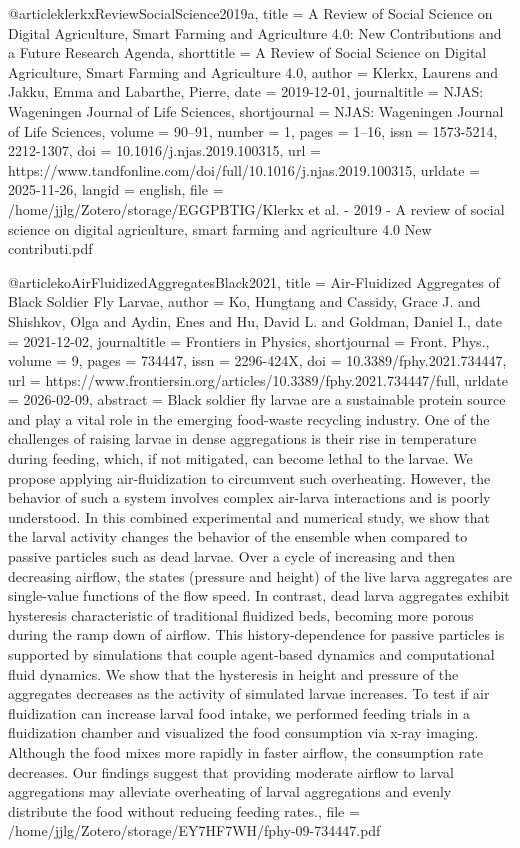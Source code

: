 {{{{@article{klerkxReviewSocialScience2019a,
  title = {A Review of Social Science on Digital Agriculture, Smart Farming and Agriculture 4.0: {{New}} Contributions and a Future Research Agenda},
  shorttitle = {A Review of Social Science on Digital Agriculture, Smart Farming and Agriculture 4.0},
  author = {Klerkx, Laurens and Jakku, Emma and Labarthe, Pierre},
  date = {2019-12-01},
  journaltitle = {NJAS: Wageningen Journal of Life Sciences},
  shortjournal = {NJAS: Wageningen Journal of Life Sciences},
  volume = {90--91},
  number = {1},
  pages = {1--16},
  issn = {1573-5214, 2212-1307},
  doi = {10.1016/j.njas.2019.100315},
  url = {https://www.tandfonline.com/doi/full/10.1016/j.njas.2019.100315},
  urldate = {2025-11-26},
  langid = {english},
  file = {/home/jjlg/Zotero/storage/EGGPBTIG/Klerkx et al. - 2019 - A review of social science on digital agriculture, smart farming and agriculture 4.0 New contributi.pdf}
}

@article{koAirFluidizedAggregatesBlack2021,
  title = {Air-{{Fluidized Aggregates}} of {{Black Soldier}} Fly {{Larvae}}},
  author = {Ko, Hungtang and Cassidy, Grace J. and Shishkov, Olga and Aydin, Enes and Hu, David L. and Goldman, Daniel I.},
  date = {2021-12-02},
  journaltitle = {Frontiers in Physics},
  shortjournal = {Front. Phys.},
  volume = {9},
  pages = {734447},
  issn = {2296-424X},
  doi = {10.3389/fphy.2021.734447},
  url = {https://www.frontiersin.org/articles/10.3389/fphy.2021.734447/full},
  urldate = {2026-02-09},
  abstract = {Black soldier fly larvae are a sustainable protein source and play a vital role in the emerging food-waste recycling industry. One of the challenges of raising larvae in dense aggregations is their rise in temperature during feeding, which, if not mitigated, can become lethal to the larvae. We propose applying air-fluidization to circumvent such overheating. However, the behavior of such a system involves complex air-larva interactions and is poorly understood. In this combined experimental and numerical study, we show that the larval activity changes the behavior of the ensemble when compared to passive particles such as dead larvae. Over a cycle of increasing and then decreasing airflow, the states (pressure and height) of the live larva aggregates are single-value functions of the flow speed. In contrast, dead larva aggregates exhibit hysteresis characteristic of traditional fluidized beds, becoming more porous during the ramp down of airflow. This history-dependence for passive particles is supported by simulations that couple agent-based dynamics and computational fluid dynamics. We show that the hysteresis in height and pressure of the aggregates decreases as the activity of simulated larvae increases. To test if air fluidization can increase larval food intake, we performed feeding trials in a fluidization chamber and visualized the food consumption via x-ray imaging. Although the food mixes more rapidly in faster airflow, the consumption rate decreases. Our findings suggest that providing moderate airflow to larval aggregations may alleviate overheating of larval aggregations and evenly distribute the food without reducing feeding rates.},
  file = {/home/jjlg/Zotero/storage/EY7HF7WH/fphy-09-734447.pdf}
}

}}}}
